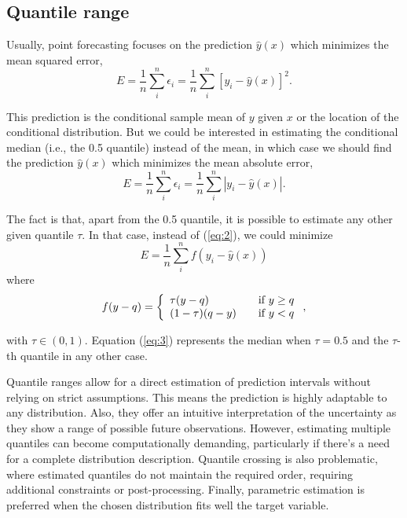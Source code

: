 \documentclass[12pt,a4paper]{book}
\begin{document}
\subsection{Quantile range}
\label{status:quantile}
Usually, point forecasting focuses on the prediction $\hat y(x)$ which minimizes the mean squared error,
\begin{equation}
  \label{eq:1}
  E = \frac{1}{n} \sum^n_i \epsilon_i =
  \frac{1}{n} \sum^n_i [ y_i - \hat y(x)]^2.
\end{equation}

This prediction is the conditional sample mean of $y$ given $x$ or the location of the conditional distribution. But we could be interested in estimating the conditional median (i.e., the 0.5 quantile) instead of the mean, in which case we should find the prediction $\hat y(x)$ which minimizes the mean absolute error,
\begin{equation}
  \label{eq:2}
  E = \frac{1}{n} \sum^n_i \epsilon_i =
  \frac{1}{n} \sum^n_i | y_i - \hat y(x) |.
\end{equation}

The fact is that, apart from the 0.5 quantile, it is possible to estimate any other given quantile $\tau$. In that case, instead of (\ref{eq:2}), we could minimize
\begin{equation}
  \label{eq:3}
  E= \frac{1}{n} \sum^n_i f( y_i - \hat y(x))
\end{equation}
where
\begin{equation}
  \label{eq:4}
  f(y-q) = \left\{ 
    \begin{array}{l l}
      \tau (y-q) & \quad \mbox{if $y \ge q$}\\
      (1-\tau) (q-y) & \quad \mbox{if $y < q$}\\
    \end{array} \right.,
\end{equation}

with $\tau \in (0,1)$. Equation (\ref{eq:3}) represents the median when $\tau=0.5$ and the $\tau$-th quantile in any other case.

Quantile ranges allow for a direct estimation of prediction intervals without relying on strict assumptions. This means the prediction is highly adaptable to any distribution.
Also, they offer an intuitive interpretation of the uncertainty as they show a range of possible future observations. However, estimating multiple quantiles can become computationally demanding, particularly if there's a need for a complete distribution description. Quantile crossing is also problematic, where estimated quantiles do not maintain the required order, requiring additional constraints or post-processing. Finally, parametric estimation is preferred when the chosen distribution fits well the target variable.
\end{document}
